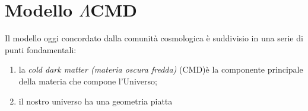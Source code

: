 \section{Modello $\Lambda$CMD}\label{sec:modello-CDM}

Il modello oggi concordato dalla comunità cosmologica è suddivisio in una serie di punti fondamentali:
\begin{enumerate}
    \item la \textit{cold dark matter (materia oscura fredda)} (CMD)è la componente principale della materia che compone l'Universo;
    \item il nostro universo ha una geometria piatta
\end{enumerate}